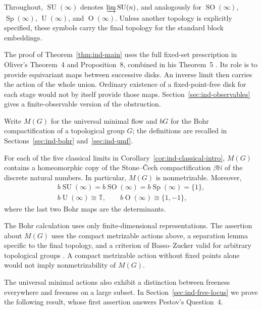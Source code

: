 Throughout, $\operatorname{SU}(\infty)$ denotes $\varinjlim\operatorname{SU}(n)$, and analogously
for $\operatorname{SO}(\infty)$, $\operatorname{Sp}(\infty)$, $\operatorname{U}(\infty)$, and $\operatorname{O}(\infty)$.
Unless another topology is explicitly specified, these symbols carry
the final topology for the standard block embeddings.

The proof of Theorem~\ref{thm:ind-main} uses the full fixed-set prescription
in Oliver's Theorem~4 and Proposition~8, combined in his Theorem~5
\cite{Oliver1976}. Its role is
to provide equivariant maps between successive disks. An inverse limit
then carries the action of the whole union. Ordinary existence of a
fixed-point-free disk for each stage would not by itself provide those
maps. Section~\ref{sec:ind-observables} gives a finite-observable version
of the obstruction.

Write $M(G)$ for the universal minimal flow and $bG$ for the Bohr
compactification of a topological group $G$; the definitions are recalled
in Sections~\ref{sec:ind-bohr} and~\ref{sec:ind-umf}.

\begin{theorem}\label{thm:ind-dynamics-intro}
For each of the five classical limits in
Corollary~\ref{cor:ind-classical-intro}, $M(G)$ contains a homeomorphic copy
of the Stone--\v{C}ech compactification $\beta\mathbb N$ of the discrete natural
numbers. In particular, $M(G)$ is nonmetrizable. Moreover,
\begin{gather*}
b\operatorname{SU}(\infty)=b\operatorname{SO}(\infty)=b\operatorname{Sp}(\infty)=\{1\},\\
b\operatorname{U}(\infty)\cong\mathbb T,\qquad b\operatorname{O}(\infty)\cong\{1,-1\},
\end{gather*}
where the last two Bohr maps are the determinants.
\end{theorem}

The Bohr calculation uses only finite-dimensional representations.
The assertion about $M(G)$ uses the compact metrizable actions above,
a separation lemma specific to the final topology, and a criterion of
Basso--Zucker valid for arbitrary topological groups
\cite{BassoZucker2021}. A compact metrizable action without fixed points
alone would not imply nonmetrizability of $M(G)$.

The universal minimal actions also exhibit a distinction between
freeness everywhere and freeness on a large subset. In
Section~\ref{sec:ind-free-locus} we prove the following result, whose first
assertion answers Pestov's Question~4.

